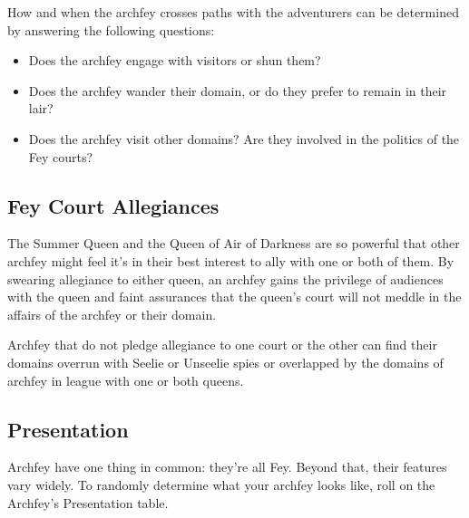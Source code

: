 \documentclass[10pt,a4paper,twoside,bg=print,twocolumn,openany,nodeprecatedcode]{dndbook}
\begin{document}
How and when the archfey crosses paths with the adventurers can be determined by answering the following questions:


\begin{itemize}
\item Does the archfey engage with visitors or shun them?
\item Does the archfey wander their domain, or do they prefer to remain in their lair?
\item Does the archfey visit other domains? Are they involved in the politics of the Fey courts?
\end{itemize}

\subsection{Fey Court Allegiances}
The Summer Queen and the Queen of Air of Darkness are so powerful that other archfey might feel it's in their best interest to ally with one or both of them. By swearing allegiance to either queen, an archfey gains the privilege of audiences with the queen and faint assurances that the queen's court will not meddle in the affairs of the archfey or their domain.

Archfey that do not pledge allegiance to one court or the other can find their domains overrun with Seelie or Unseelie spies or overlapped by the domains of archfey in league with one or both queens.

\subsection{Presentation}
Archfey have one thing in common: they're all Fey. Beyond that, their features vary widely. To randomly determine what your archfey looks like, roll on the Archfey's Presentation table.
\end{document}
